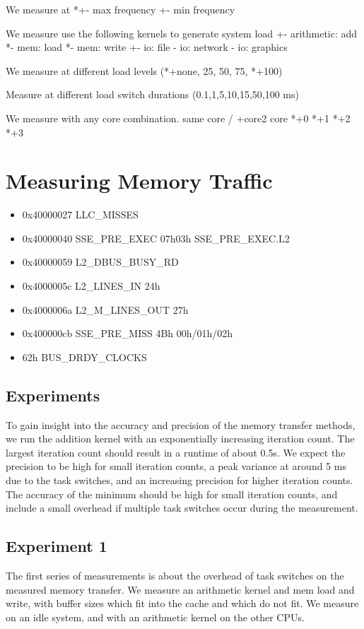 \documentclass[a4paper,12pt]{article}
\begin{document}
We measure at 
*+- max frequency
+- min frequency

We measure use the following kernels to generate system load
+- arithmetic: add
*- mem: load
*- mem: write
+- io: file 
- io: network
- io: graphics

We measure at different load levels (*+none, 25, 50, 75, *+100)

Measure at different load switch durations (0.1,1,5,10,15,50,100 ms)

We measure with any core combination.
same core / +core2
core *+0 *+1 *+2 *+3



\section{Measuring Memory Traffic}
\begin{itemize}
\item 0x40000027   LLC\_MISSES
\item 0x40000040   SSE\_PRE\_EXEC 07h03h SSE\_PRE\_EXEC.L2
\item 0x40000059   L2\_DBUS\_BUSY\_RD
\item 0x4000005c   L2\_LINES\_IN  24h
\item 0x4000006a   L2\_M\_LINES\_OUT  27h
\item 0x400000cb   SSE\_PRE\_MISS 4Bh 00h/01h/02h
\item 62h BUS\_DRDY\_CLOCKS
\end{itemize}

\subsection{Experiments}
To gain insight into the accuracy and precision of the memory transfer methods,
we run the addition kernel with an exponentially increasing iteration count. The
largest iteration count should result in a runtime of about 0.5s. We expect the
precision to be high for small iteration counts, a peak variance at around 5 ms
due to the task switches, and an increasing precision for higher iteration
counts. The accuracy of the minimum should be high for small iteration counts,
and include a small overhead if multiple task switches occur during the
measurement.

\subsection{Experiment 1}
The first series of measurements is about the overhead of task switches on the
measured memory transfer. We measure an arithmetic kernel and mem load and
write, with buffer sizes which fit into the cache and which do not fit. We
measure on an idle system, and with an arithmetic kernel on the other CPUs.
\end{document}
